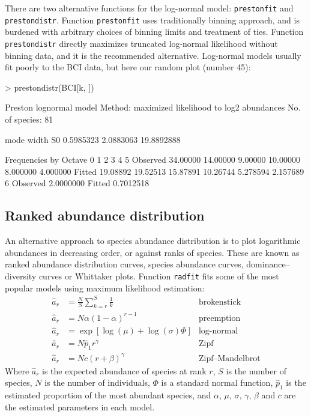 \documentclass[a4paper,10pt]{amsart}
\begin{document}
There are two alternative functions for the log-normal model:
\texttt{prestonfit} and \texttt{prestondistr}.  Function
\texttt{prestonfit} uses traditionally binning approach, and is burdened
with arbitrary choices of binning limits and treatment of ties.
Function \texttt{prestondistr} directly
maximizes truncated log-normal likelihood without binning data, and it
is the recommended alternative.  Log-normal models  usually fit poorly
to the BCI data, but here our random plot (number 45):
\begin{Schunk}
\begin{Sinput}
> prestondistr(BCI[k, ])
\end{Sinput}
\begin{Soutput}
Preston lognormal model
Method: maximized likelihood to log2 abundances 
No. of species: 81 

      mode      width         S0 
 0.5985323  2.0883063 19.8892888 

Frequencies by Octave
                0        1        2        3        4        5
Observed 34.00000 14.00000  9.00000 10.00000 8.000000 4.000000
Fitted   19.08892 19.52513 15.87891 10.26744 5.278594 2.157689
                 6
Observed 2.0000000
Fitted   0.7012518
\end{Soutput}
\end{Schunk}

\subsection{Ranked abundance distribution}

An alternative approach to species abundance distribution is to plot
logarithmic abundances in decreasing order, or against ranks of
species.  These are known as ranked abundance
distribution curves, species abundance curves, dominance--diversity
curves or Whittaker plots.
Function \texttt{radfit} fits some of the most popular models using
maximum likelihood estimation:
\begin{align}
\hat a_r &= \frac{N}{S} \sum_{k=r}^S \frac{1}{k} &\text{brokenstick}\\
\hat a_r &= N \alpha (1-\alpha)^{r-1} & \text{preemption} \\
\hat a_r &= \exp \left[\log (\mu) + \log (\sigma) \Phi \right]
&\text{log-normal}\\
\hat a_r &= N \hat p_1 r^\gamma &\text{Zipf}\\
\hat a_r &= N c (r + \beta)^\gamma &\text{Zipf--Mandelbrot}
\end{align}
Where $\hat a_r$ is the expected abundance of species at rank $r$, $S$
is the number of species, $N$ is the number of individuals, $\Phi$ is
a standard normal function, $\hat p_1$ is the estimated proportion of
the most abundant species, and $\alpha$, $\mu$, $\sigma$, $\gamma$,
$\beta$ and $c$ are the estimated parameters in each model.
\end{document}
